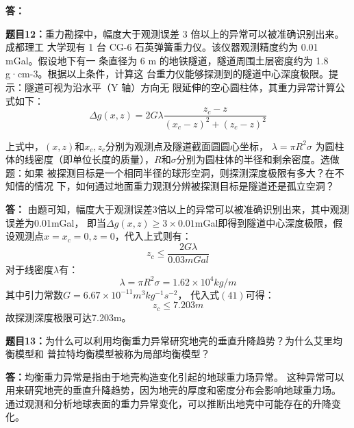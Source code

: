 \documentclass[12pt,a4paper]{article}
\begin{document}
\vspace{5pt}
\noindent
{\bf 答：}




\vspace{10pt}
\noindent
{\bf 题目12：}重力勘探中，幅度大于观测误差 3 倍以上的异常可以被准确识别出来。成都理工
大学现有 1 台 CG-6 石英弹簧重力仪。该仪器观测精度约为 0.01 mGal。假设地下有一
条直径为 6 m 的地铁隧道，隧道周围土层密度约为 1.8 g·cm-3。根据以上条件，计算这
台重力仪能够探测到的隧道中心深度极限。提示：隧道可视为沿水平（Y 轴）方向无
限延伸的空心圆柱体，其重力异常计算公式如下：
\begin{equation}
    \Delta g\left(x,z\right)=2G\lambda\frac{z_c-z}{\left(x_c-z\right)^2+\left(z_c-z\right)^2}
\end{equation}

\noindent
上式中，$(x, z)$和$x_c, z_c$分别为观测点及隧道截面圆圆心坐标， $\lambda = \pi R^2 \sigma$
为圆柱体的线密度（即单位长度的质量），$R$和$\sigma$分别为圆柱体的半径和剩余密度。选做题：如果
被探测目标是一个相同半径的球形空洞，则探测深度极限有多大？在不知情的情况
下，如何通过地面重力观测分辨被探测目标是隧道还是孤立空洞？

\vspace{5pt}
\noindent
{\bf 答：} 由题可知，幅度大于观测误差3倍以上的异常可以被准确识别出来，其中观测误差为0.01mGal，
即当$\Delta g(x, z) \geq 3 \times 0.01$mGal即得到隧道中心深度极限，假设观测点$x = x_c = 0,
z = 0$，代入上式则有：
\begin{equation}
    z_c \leq \frac{ 2 G \lambda}  {0.03 mGal}
\end{equation}
对于线密度$\lambda$有：
\begin{equation}
    \lambda = \pi R^2 \sigma = 1.62 \times 10^4 kg / m
\end{equation}
其中引力常数$G = 6.67 \times 10^{-11} m^3 kg^{-1} s^{-2}$，
代入式$(41)$可得：
\begin{equation}
    z_c \leq 7.203m
\end{equation}
故探测深度极限可达7.203m。

\vspace{10pt}
\noindent
{\bf 题目13：}为什么可以利用均衡重力异常研究地壳的垂直升降趋势？为什么艾里均衡模型和
普拉特均衡模型被称为局部均衡模型？

\vspace{5pt}
\noindent
{\bf 答：}均衡重力异常是指由于地壳构造变化引起的地球重力场异常。
这种异常可以用来研究地壳的垂直升降趋势，因为地壳的厚度和密度分布会影响地球重力场。
通过观测和分析地球表面的重力异常变化，可以推断出地壳中可能存在的升降变化。
\end{document}

